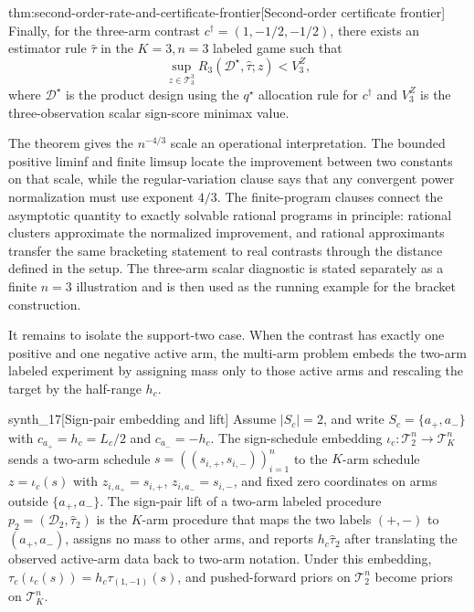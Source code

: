 \documentclass[11pt]{article}
\begin{document}
\begin{theoremv}{thm:second-order-rate-and-certificate-frontier}[Second-order certificate frontier]
Finally, for the three-arm contrast \(c^\dagger=(1,-1/2,-1/2)\), there exists an estimator rule \(\widehat\tau\) in the \(K=3,n=3\) labeled game such that
\[
\sup_{z\in\mathcal T_3^3}
R_3(\mathcal D^\star,\widehat\tau;z)
<
V_3^Z,
\]
where \(\mathcal D^\star\) is the product design using the \(q^\star\) allocation rule for \(c^\dagger\) and \(V_3^Z\) is the three-observation scalar sign-score minimax value.
\end{theoremv}

The theorem gives the \(n^{-4/3}\) scale an operational interpretation. The bounded positive liminf and finite limsup locate the improvement between two constants on that scale, while the regular-variation clause says that any convergent power normalization must use exponent \(4/3\). The finite-program clauses connect the asymptotic quantity to exactly solvable rational programs in principle: rational clusters approximate the normalized improvement, and rational approximants transfer the same bracketing statement to real contrasts through the distance defined in the setup. The three-arm scalar diagnostic is stated separately as a finite \(n=3\) illustration and is then used as the running example for the bracket construction.

It remains to isolate the support-two case. When the contrast has exactly one positive and one negative active arm, the multi-arm problem embeds the two-arm labeled experiment by assigning mass only to those active arms and rescaling the target by the half-range \(h_c\).

\begin{definitionv}{synth_17}[Sign-pair embedding and lift]
Assume \(|S_c|=2\), and write \(S_c=\{a_+,a_-\}\) with \(c_{a_+}=h_c=L_c/2\) and \(c_{a_-}=-h_c\). The sign-schedule embedding \(\iota_c:\mathcal T_2^n\to\mathcal T_K^n\) sends a two-arm schedule \(s=((s_{i,+},s_{i,-}))_{i=1}^n\) to the \(K\)-arm schedule \(z=\iota_c(s)\) with \(z_{i,a_+}=s_{i,+}\), \(z_{i,a_-}=s_{i,-}\), and fixed zero coordinates on arms outside \(\{a_+,a_-\}\). The sign-pair lift of a two-arm labeled procedure \(p_2=(\mathcal D_2,\widehat\tau_2)\) is the \(K\)-arm procedure that maps the two labels \((+, -)\) to \((a_+,a_-)\), assigns no mass to other arms, and reports \(h_c\widehat\tau_2\) after translating the observed active-arm data back to two-arm notation. Under this embedding, \(\tau_c(\iota_c(s))=h_c\tau_{(1,-1)}(s)\), and pushed-forward priors on \(\mathcal T_2^n\) become priors on \(\mathcal T_K^n\).
\end{definitionv}
\end{document}
